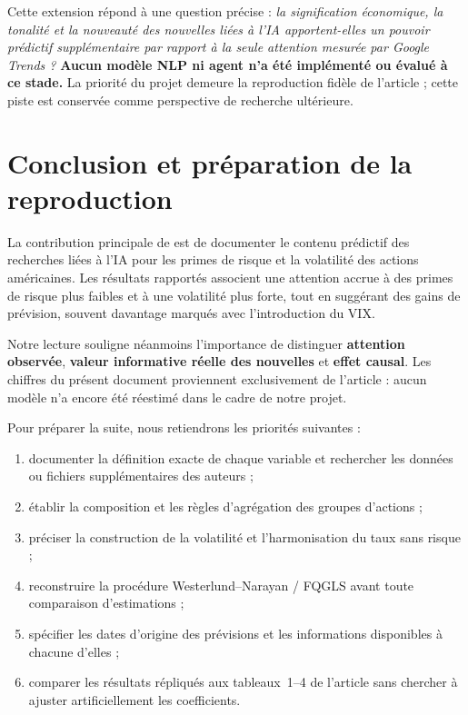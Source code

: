 \documentclass[11pt,a4paper]{article}
\begin{document}
Cette extension répond à une question précise : \emph{la signification économique, la tonalité et la nouveauté des nouvelles liées à l'IA apportent-elles un pouvoir prédictif supplémentaire par rapport à la seule attention mesurée par Google Trends ?} \textbf{Aucun modèle NLP ni agent n'a été implémenté ou évalué à ce stade.} La priorité du projet demeure la reproduction fidèle de l'article ; cette piste est conservée comme perspective de recherche ultérieure.

\section{Conclusion et préparation de la reproduction}
La contribution principale de \cite{SalisuBadmus2026} est de documenter le contenu prédictif des recherches liées à l'IA pour les primes de risque et la volatilité des actions américaines. Les résultats rapportés associent une attention accrue à des primes de risque plus faibles et à une volatilité plus forte, tout en suggérant des gains de prévision, souvent davantage marqués avec l'introduction du VIX.

Notre lecture souligne néanmoins l'importance de distinguer \textbf{attention observée}, \textbf{valeur informative réelle des nouvelles} et \textbf{effet causal}. Les chiffres du présent document proviennent exclusivement de l'article : aucun modèle n'a encore été réestimé dans le cadre de notre projet.

Pour préparer la suite, nous retiendrons les priorités suivantes :
\begin{enumerate}
\item documenter la définition exacte de chaque variable et rechercher les données ou fichiers supplémentaires des auteurs ;
\item établir la composition et les règles d'agrégation des groupes d'actions ;
\item préciser la construction de la volatilité et l'harmonisation du taux sans risque ;
\item reconstruire la procédure Westerlund--Narayan / FQGLS avant toute comparaison d'estimations ;
\item spécifier les dates d'origine des prévisions et les informations disponibles à chacune d'elles ;
\item comparer les résultats répliqués aux tableaux~1--4 de l'article sans chercher à ajuster artificiellement les coefficients.
\end{enumerate}
\end{document}

